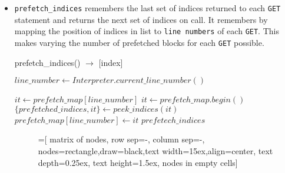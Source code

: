 \begin{itemize}
\item \texttt{prefetch\_indices} remembers the last set of indices returned to each
  \texttt{GET} statement and returns the next set of indices on call. It remembers
  by mapping the position of indices in list to \texttt{line numbers} of each
  \texttt{GET}. This makes varying the number of prefetched blocks for each
  \texttt{GET} possible.

  \begin{algorithm} {prefetch\_indices() $\rightarrow$ [index]}
    \singlespacing

    \begin{algorithmic}[1]
      \State $line\_number \gets Interpreter.current\_line\_number()$

      \State $it \gets prefetch\_map[line\_number]$
      \Else
      \State $it \gets prefetch\_map.begin()$
      \EndIf
      \State $\{prefetched\_indices, it\} \gets peek\_indices(it)$
      \State $prefetch\_map[line\_number] \gets it$
      \State \Return $prefetech\_indices$
      \EndFunction
    \end{algorithmic}
  \end{algorithm}

  \begin{figure}[h] %
    \centering

    =[
    matrix of nodes,
    row sep=-\pgflinewidth,
    column sep=-\pgflinewidth,
    nodes={rectangle,draw=black,text width=15ex,align=center},
    text depth=0.25ex,
    text height=1.5ex,
    nodes in empty cells]
\end{figure}
\end{itemize}

